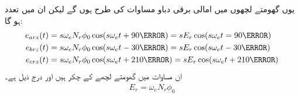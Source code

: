 یوں گھومتے لچھوں میں امالی برقی دباو مساوات   کی طرح  ہوں گے لیکن  ان میں تعدد  ہو گا:
\begin{gather}
\begin{aligned}\label{مساوات_امالی_گھومتا_حصہ_تین_دور_سائن_نما_برقی_دباو}
e_{arz}(t)&=s \omega_e N_r \phi_0 \cos (s \omega_e t +90\degree)=s E_r \cos (s \omega_e t =90\degree)\\
e_{brz}(t)&=s \omega_e N_r \phi_0 \cos (s \omega_e t -30\degree)= s E_r \cos (s \omega_e t -30\degree)\\
e_{crz}(t)&=s \omega_e N_r \phi_0 \cos (s \omega_e t +210\degree)= s E_r \cos (s \omega_e t +210\degree)
\end{aligned}
\end{gather}
ان مساوات میں   گھومتے لچھے کے چکر ہیں اور  درج ذیل ہے۔
\begin{align}
E_r=\omega_e N_r \phi_0
\end{align}

